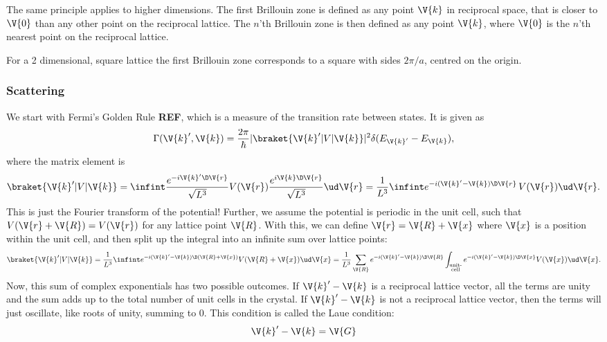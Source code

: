 \documentclass[main.tex]{subfiles}
\begin{document}
	The same principle applies to higher dimensions. The first Brillouin zone is defined as any point $ \V{k} $ in reciprocal space, that is closer to $ \V{0} $ than any other point on the reciprocal lattice. The $ n $'th Brillouin zone is then defined as any point $ \V{k} $, where $ \V{0} $ is the $ n $'th nearest point on the reciprocal lattice.
	
	For a 2 dimensional, square lattice the first Brillouin zone corresponds to a square with sides $ 2\pi /a $, centred on the origin.
	
	\subsubsection{Scattering}
	We start with Fermi's Golden Rule \textbf{REF}, which is a measure of the transition rate between states. It is given as
	\begin{equation}\label{eq:Scat_fermi}
		\Gamma(\V{k}', \V{k}) = \frac{2\pi}{\hbar}|\braket{\V{k}' | V | \V{k}}|^2 \delta(E_{\V{k}'}-E_{\V{k}}),
	\end{equation}
	where the matrix element is
	\begin{equation}\label{eq:Scat_mat_el_initial}
		\braket{\V{k}' | V | \V{k}} = \infint \frac{e^{-i \V{k}'\D\V{r}}}{\sqrt{L^3}} V(\V{r}) \frac{e^{i \V{k}\D\V{r}}}{\sqrt{L^3}} \ud \V{r} = \frac{1}{L^3} \infint e^{-i(\V{k}'-\V{k}) \D \V{r}} \, V(\V{r}) \ud \V{r}.
	\end{equation}
	This is just the Fourier transform of the potential! Further, we assume the potential is periodic in the unit cell, such that $ V(\V{r} + \V{R}) =  V(\V{r}) $ for any lattice point $ \V{R} $. With this, we can define $ \V{r} = \V{R} + \V{x} $ where $ \V{x} $ is a position within the unit cell, and then split up the integral into an infinite sum over lattice points:
	\begin{equation}\label{eq:Scat_mat_el}
		\braket{\V{k}' | V | \V{k}} = \frac{1}{L^3}\infint e^{-i(\V{k}'-\V{k})\D(\V{R}+\V{x})} V(\V{R}+ \V{x}) \ud \V{x} = \frac{1}{L^3} \sum_{\V{R}} e^{-i(\V{k}'-\V{k}) \D \V{R}}\int_{\substack{\text{unit-} \\\text{cell}}} e^{-i (\V{k}'-\V{k}) \D \V{x}} V(\V{x}) \ud \V{x}.
	\end{equation}
	Now, this sum of complex exponentials has two possible outcomes. If $ \V{k}'-\V{k} $ is a reciprocal lattice vector, all the terms are unity and the sum adds up to the total number of unit cells in the crystal. If $ \V{k}'-\V{k} $ is not a reciprocal lattice vector, then the terms will just oscillate, like roots of unity, summing to 0. This condition is called the Laue condition:
	\begin{equation}\label{eq:Scat_Laue}
		\V{k}' - \V{k} =  \V{G}
	\end{equation}
	
\end{document}
